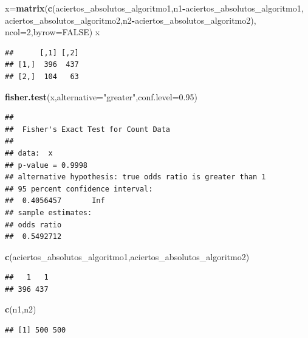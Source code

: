 \documentclass[
]{article}
\newenvironment{Shaded}{\begin{snugshade}}{\end{snugshade}}
\newcommand{\DataTypeTok}[1]{\textcolor[rgb]{0.13,0.29,0.53}{#1}}
\newcommand{\DecValTok}[1]{\textcolor[rgb]{0.00,0.00,0.81}{#1}}
\newcommand{\FloatTok}[1]{\textcolor[rgb]{0.00,0.00,0.81}{#1}}
\newcommand{\KeywordTok}[1]{\textcolor[rgb]{0.13,0.29,0.53}{\textbf{#1}}}
\newcommand{\NormalTok}[1]{#1}
\newcommand{\OperatorTok}[1]{\textcolor[rgb]{0.81,0.36,0.00}{\textbf{#1}}}
\newcommand{\OtherTok}[1]{\textcolor[rgb]{0.56,0.35,0.01}{#1}}
\newcommand{\StringTok}[1]{\textcolor[rgb]{0.31,0.60,0.02}{#1}}
\begin{document}
\begin{Shaded}
\begin{Highlighting}[]
\NormalTok{x=}\KeywordTok{matrix}\NormalTok{(}\KeywordTok{c}\NormalTok{(aciertos_absolutos_algoritmo1,n1}\OperatorTok{-}\NormalTok{aciertos_absolutos_algoritmo1,}
\NormalTok{           aciertos_absolutos_algoritmo2,n2}\OperatorTok{-}\NormalTok{aciertos_absolutos_algoritmo2),}
         \DataTypeTok{ncol=}\DecValTok{2}\NormalTok{,}\DataTypeTok{byrow=}\OtherTok{FALSE}\NormalTok{)}
\NormalTok{x}
\end{Highlighting}
\end{Shaded}

\begin{verbatim}
##      [,1] [,2]
## [1,]  396  437
## [2,]  104   63
\end{verbatim}

\begin{Shaded}
\begin{Highlighting}[]
\KeywordTok{fisher.test}\NormalTok{(x,}\DataTypeTok{alternative=}\StringTok{"greater"}\NormalTok{,}\DataTypeTok{conf.level=}\FloatTok{0.95}\NormalTok{)}
\end{Highlighting}
\end{Shaded}

\begin{verbatim}
## 
##  Fisher's Exact Test for Count Data
## 
## data:  x
## p-value = 0.9998
## alternative hypothesis: true odds ratio is greater than 1
## 95 percent confidence interval:
##  0.4056457       Inf
## sample estimates:
## odds ratio 
##  0.5492712
\end{verbatim}

\begin{Shaded}
\begin{Highlighting}[]
\KeywordTok{c}\NormalTok{(aciertos_absolutos_algoritmo1,aciertos_absolutos_algoritmo2)}
\end{Highlighting}
\end{Shaded}

\begin{verbatim}
##   1   1 
## 396 437
\end{verbatim}

\begin{Shaded}
\begin{Highlighting}[]
\KeywordTok{c}\NormalTok{(n1,n2)}
\end{Highlighting}
\end{Shaded}

\begin{verbatim}
## [1] 500 500
\end{verbatim}
\end{document}
